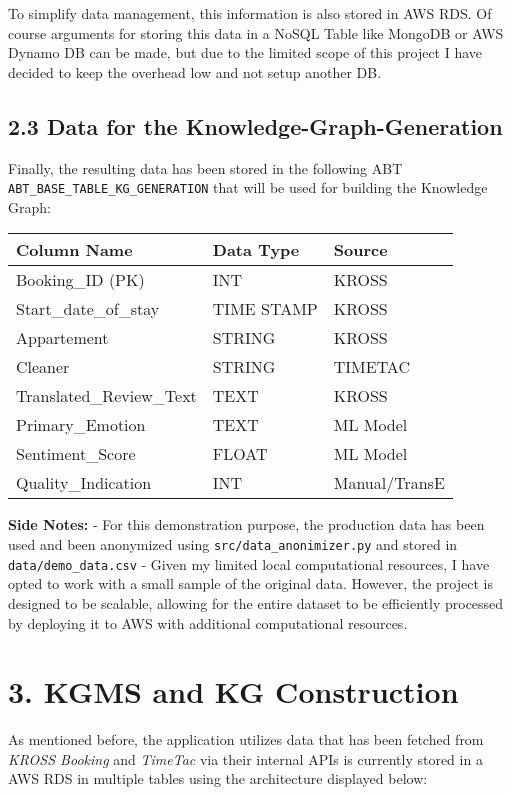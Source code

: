 \documentclass[
]{article}
\makeatletter
\newcommand*\pandocbounded[1]{%
  \sbox\pandoc@box{#1}%
  \Gscale@div\@tempa{\textheight}{\dimexpr\ht\pandoc@box+\dp\pandoc@box\relax}%
  \Gscale@div\@tempb{\linewidth}{\wd\pandoc@box}%
  \ifdim\@tempb\p@<\@tempa\p@\let\@tempa\@tempb\fi%
  \ifdim\@tempa\p@<\p@\scalebox{\@tempa}{\usebox\pandoc@box}%
  \else\usebox{\pandoc@box}%
  \fi%
}
\makeatother
\begin{document}
To simplify data management, this information is also stored in AWS RDS.
Of course arguments for storing this data in a NoSQL Table like MongoDB
or AWS Dynamo DB can be made, but due to the limited scope of this
project I have decided to keep the overhead low and not setup another
DB.

\subsection{2.3 Data for the
Knowledge-Graph-Generation}\label{data-for-the-knowledge-graph-generation}

Finally, the resulting data has been stored in the following ABT
\texttt{ABT\_BASE\_TABLE\_KG\_GENERATION} that will be used for building
the Knowledge Graph:

\begin{longtable}[]{@{}lll@{}}
\toprule\noalign{}
Column Name & Data Type & Source \\
\midrule\noalign{}
\endhead
\bottomrule\noalign{}
\endlastfoot
Booking\_ID (PK) & INT & KROSS \\
Start\_date\_of\_stay & TIME STAMP & KROSS \\
Appartement & STRING & KROSS \\
Cleaner & STRING & TIMETAC \\
Translated\_Review\_Text & TEXT & KROSS \\
Primary\_Emotion & TEXT & ML Model \\
Sentiment\_Score & FLOAT & ML Model \\
Quality\_Indication & INT & Manual/TransE \\
\end{longtable}

\textbf{Side Notes:} - For this demonstration purpose, the production
data has been used and been anonymized using
\texttt{src/data\_anonimizer.py} and stored in
\texttt{data/demo\_data.csv} - Given my limited local computational
resources, I have opted to work with a small sample of the original
data. However, the project is designed to be scalable, allowing for the
entire dataset to be efficiently processed by deploying it to AWS with
additional computational resources.

\section{3. KGMS and KG Construction}\label{kgms-and-kg-construction}

As mentioned before, the application utilizes data that has been fetched
from \emph{KROSS Booking} and \emph{TimeTac} via their internal APIs is
currently stored in a AWS RDS in multiple tables using the architecture
displayed below:
\pandocbounded{}
\end{document}
